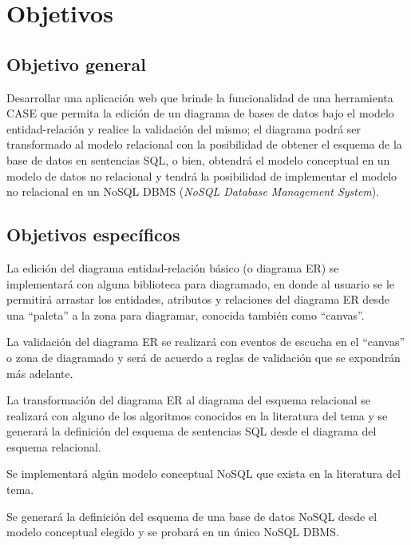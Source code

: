 \section{Objetivos}

\subsection*{Objetivo general}
Desarrollar una aplicación web que brinde la funcionalidad de una herramienta CASE que permita la edición de un diagrama de bases de datos bajo el modelo entidad-relación y realice la validación del mismo; el diagrama podrá ser transformado al modelo relacional con la posibilidad de obtener el esquema de la base de datos en sentencias SQL, o bien, obtendrá el modelo conceptual en un modelo de datos no relacional y tendrá la posibilidad de implementar el modelo no relacional en un NoSQL DBMS (\textit{NoSQL Database Management System}).

\subsection*{Objetivos específicos}

La edición del diagrama entidad-relación básico (o diagrama ER) se implementará con alguna biblioteca para diagramado, en donde al usuario se le permitirá arrastar los entidades, atributos y relaciones del diagrama ER desde una ``paleta''  a la zona para diagramar, conocida también como ``canvas''.


La validación del diagrama ER se realizará con eventos de escucha en el ``canvas'' o zona de diagramado y será de acuerdo a reglas de validación que se expondrán más adelante.


La transformación del diagrama ER al diagrama del esquema relacional se realizará con alguno de los algoritmos conocidos en la literatura del tema y se generará la definición del esquema de sentencias SQL desde el diagrama del esquema relacional.


Se implementará algún modelo conceptual NoSQL que exista en la literatura del tema.


Se generará la definición del esquema de una base de datos NoSQL desde el modelo conceptual elegido y se probará en un único NoSQL DBMS.